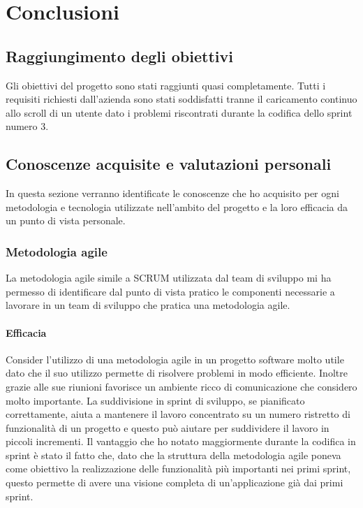 
\chapter{Conclusioni}
\label{cap:conclusioni}
\section{Raggiungimento degli obiettivi}
Gli obiettivi del progetto sono stati raggiunti quasi completamente. Tutti i requisiti richiesti dall'azienda sono stati soddisfatti tranne il caricamento continuo allo scroll di un utente dato i problemi riscontrati durante la codifica dello sprint numero 3.

\section{Conoscenze acquisite e valutazioni personali}
In questa sezione verranno identificate le conoscenze che ho acquisito per ogni metodologia e tecnologia utilizzate nell'ambito del progetto e la loro efficacia da un punto di vista personale.

\subsection{Metodologia agile}
La metodologia agile simile a SCRUM utilizzata dal team di sviluppo mi ha permesso di identificare dal punto di vista pratico le componenti necessarie a lavorare in un team di sviluppo che pratica una metodologia agile.

\subsubsection*{Efficacia}
Consider l'utilizzo di una metodologia agile in un progetto software molto utile dato che il suo utilizzo permette di risolvere problemi in modo efficiente. Inoltre grazie alle sue riunioni favorisce un ambiente ricco di comunicazione che considero molto importante. La suddivisione in sprint di sviluppo, se pianificato correttamente, aiuta a mantenere il lavoro concentrato su un numero ristretto di funzionalità di un progetto e questo può aiutare per suddividere il lavoro in piccoli incrementi. Il vantaggio che ho notato maggiormente durante la codifica in sprint è stato il fatto che, dato che la struttura della metodologia agile poneva come obiettivo la realizzazione delle funzionalità più importanti nei primi sprint, questo permette di avere una visione completa di un'applicazione già dai primi sprint.

